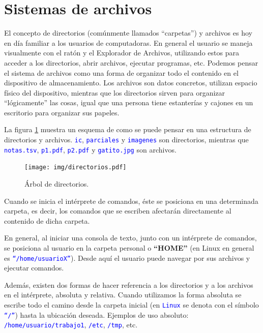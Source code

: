 \documentclass[12pt]{article}
\newcommand{\cw}[1]{\texttt{\textcolor{blue}{#1}}}
\begin{document}
\section{Sistemas de archivos}

El concepto de directorios (comúnmente llamados ``carpetas'') y archivos es
hoy en día familiar a los usuarios de computadoras. En general el usuario se
maneja visualmente con el ratón y el Explorador de Archivos, utilizando estos
para acceder a los directorios, abrir archivos, ejecutar programas, etc.
Podemos pensar el sistema de archivos como una forma de organizar todo el
contenido en el dispositivo de almacenamiento. Los archivos son datos
concretos, utilizan espacio físico del dispositivo, mientras que los
directorios sirven para organizar ``lógicamente'' las cosas, igual que una
persona tiene estanterías y cajones en un escritorio para organizar sus
papeles.

La figura \ref{arbolDirectorios} muestra un esquema de como se puede pensar en
una estructura de directorios y archivos. \cw{ic}, \cw{parciales} y
\cw{imagenes} son directorios, mientras que \cw{notas.tsv}, \cw{p1.pdf},
\cw{p2.pdf} y \cw{gatito.jpg} son archivos.

\begin{figure}[!htb]

    \centering

    \texttt{[image: img/directorios.pdf]}

    \caption{Árbol de directorios.}

    \label{arbolDirectorios}

\end{figure}

Cuando se inicia el intérprete de comandos, éste se posiciona en una
determinada carpeta, es decir, los comandos que se escriben afectarán
directamente al contenido de dicha carpeta.

En general, al iniciar una consola de texto, junto con un intérprete de
comandos, se posiciona al usuario en la carpeta personal o \textbf{``HOME''}
(en Linux en general es \cw{``/home/usuarioX''}). Desde aquí el usuario
puede navegar por sus archivos y ejecutar comandos.

Además, existen dos formas de hacer referencia a los directorios y a los
archivos en el intérprete, absoluta y relativa. Cuando utilizamos la forma
absoluta se escribe todo el camino desde la carpeta inicial (en \cw{Linux}
se denota con el símbolo \cw{``/''}) hasta la ubicación deseada. Ejemplos de
uso absoluto: \cw{/home/usuario/trabajo1}, \cw{/etc}, \cw{/tmp}, etc.
\end{document}
